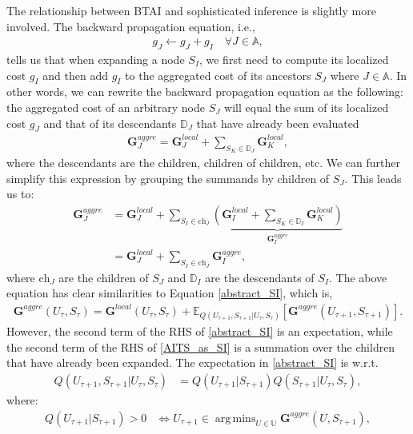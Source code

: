 \documentclass[twoside,11pt]{article}
\DeclareMathOperator*{\argmins}{arg\,mins}
\begin{document}
The relationship between BTAI and sophisticated inference is slightly more involved. The backward propagation equation, i.e.,
\begin{align}
g_J \leftarrow g_J + g_I \quad \forall J \in \mathbb{A},
\end{align}
tells us that when expanding a node $S_I$, we first need to compute its localized cost $g_I$ and then add $g_I$ to the aggregated cost of its ancestors $S_J$ where $J \in \mathbb{A}$. In other words, we can rewrite the backward propagation equation as the following: the aggregated cost of an arbitrary node $S_J$ will equal the sum of its localized cost $g_J$ and that of its descendants $\mathbb{D}_J$ that have already been evaluated
\begin{align}
\bm{G}_J^{aggre} = \bm{G}_J^{local} + \sum_{S_K \in \mathbb{D}_J} \bm{G}_K^{local},
\end{align}
where the descendants are the children, children of children, etc. We can further simplify this expression by grouping the summands by children of $S_J$. This leads us to:
\begin{align}\label{AITS_as_SI}
\bm{G}_J^{aggre} &= \bm{G}_J^{local} + \sum_{S_I \in \text{ch}_J} \underbrace{\left(\bm{G}_I^{local} + \sum_{S_K \in \mathbb{D}_I} \bm{G}_K^{local}\right)}_{\bm{G}_I^{aggre}} \\
&= \bm{G}_J^{local} + \sum_{S_I \in \text{ch}_J} \bm{G}_I^{aggre},
\end{align}
where $\text{ch}_J$ are the children of $S_J$ and $\mathbb{D}_I$ are the descendants of $S_I$. The above equation has clear similarities to Equation \eqref{abstract_SI}, which is, 
\begin{align}
\bm{G}^{aggre}(U_{\tau},S_{\tau}) = \bm{G}^{local}(U_{\tau},S_{\tau}) + \mathbb{E}_{Q(U_{\tau+1},S_{\tau+1}|U_\tau,S_\tau)}[\bm{G}^{aggre}(U_{\tau+1},S_{\tau+1})].
\end{align}
However, the second term of the RHS of \eqref{abstract_SI} is an expectation, while the second term of the RHS of \eqref{AITS_as_SI} is a summation over the children that have already been expanded. The expectation in \eqref{abstract_SI} is w.r.t.
\begin{align}
    Q(U_{\tau+1},S_{\tau+1}|U_\tau,S_\tau) &= Q(U_{\tau+1}|S_{\tau+1})Q(S_{\tau+1}|U_\tau,S_\tau),
\end{align}
where:
\begin{align}
    Q(U_{\tau+1}|S_{\tau+1}) > 0 &\Leftrightarrow U_{\tau+1} \in \argmins_{U \in \mathbb{U}} \bm{G}^{aggre}(U,S_{\tau+1}),
\end{align}
\end{document}
